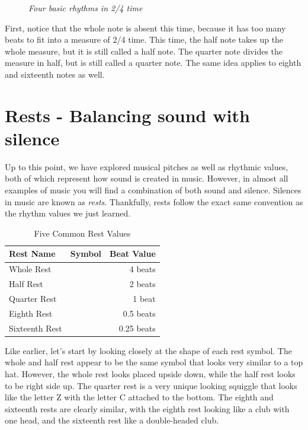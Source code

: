 \begin{figure}[h]
	\begin{center}
	\end{center}
	\caption{\textit{Four basic rhythms in 2/4 time}}
\end{figure}

First, notice that the whole note is absent this time, because it has too many beats to fit into a measure of 2/4 time. This time, the half note takes up the whole measure, but it is still called a half note. The quarter note divides the measure in half, but is still called a quarter note. The same idea applies to eighth and sixteenth notes as well. 

\section{Rests - Balancing sound with silence}

Up to this point, we have explored musical pitches as well as rhythmic values, both of which represent how sound is created in music. However, in almost all examples of music you will find a combination of both sound and silence. Silences in music are known as \textit{rests}. Thankfully, rests follow the exact same convention as the rhythm values we just learned.

\newpage

\begin{table}[h]
	\large
	\centering
	\caption{Five Common Rest Values}
	\label{tab:booktabs_example}
	\begin{tabular}{lcr}
		\toprule
		\textbf{Rest Name} & \textbf{Symbol} & \textbf{Beat Value} \\ 
		\midrule
		Whole Rest       & \wholeNoteRest       & 4 beats         \\
		Half Rest        & \halfNoteRest       & 2 beats         \\
		Quarter Rest     & \crotchetRest     & 1 beat          \\
		Eighth Rest		 & \quaverRest	    & 0.5 beats		  \\
		Sixteenth Rest   & \semiquaverRest   & 0.25 beats      \\
		\bottomrule
	\end{tabular}
\end{table}

Like earlier, let's start by looking closely at the shape of each rest symbol. The whole and half rest appear to be the same symbol that looks very similar to a top hat. However, the whole rest looks placed upside down, while the half rest looks to be right side up. The quarter rest is a very unique looking squiggle that looks like the letter Z with the letter C attached to the bottom. The eighth and sixteenth rests are clearly similar, with the eighth rest looking like a club with one head, and the sixteenth rest like a double-headed club. 

